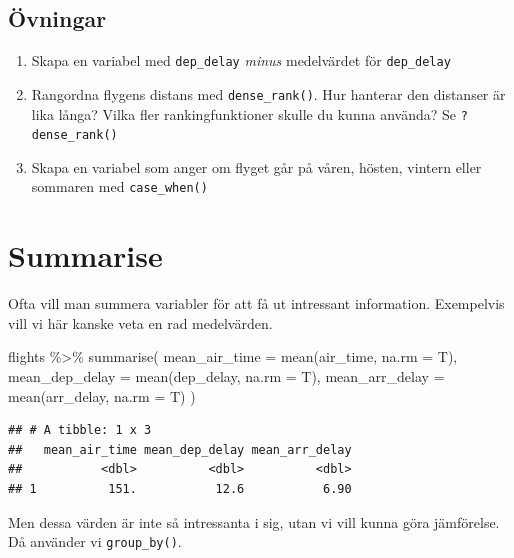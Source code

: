 \documentclass[
]{book}
\newenvironment{Shaded}{\begin{snugshade}}{\end{snugshade}}
\newcommand{\AttributeTok}[1]{\textcolor[rgb]{0.77,0.63,0.00}{#1}}
\newcommand{\FunctionTok}[1]{\textcolor[rgb]{0.00,0.00,0.00}{#1}}
\newcommand{\NormalTok}[1]{#1}
\newcommand{\SpecialCharTok}[1]{\textcolor[rgb]{0.00,0.00,0.00}{#1}}
\begin{document}
\hypertarget{uxf6vningar}{%
\subsection{Övningar}\label{uxf6vningar}}

\begin{enumerate}
\def\labelenumi{\arabic{enumi}.}
\item
  Skapa en variabel med \texttt{dep\_delay} \emph{minus} medelvärdet för \texttt{dep\_delay}
\item
  Rangordna flygens distans med \texttt{dense\_rank()}. Hur hanterar den distanser är lika långa? Vilka fler rankingfunktioner skulle du kunna använda? Se \texttt{?dense\_rank()}
\item
  Skapa en variabel som anger om flyget går på våren, hösten, vintern eller sommaren med \texttt{case\_when()}
\end{enumerate}

\hypertarget{summarise}{%
\section{Summarise}\label{summarise}}

Ofta vill man summera variabler för att få ut intressant information. Exempelvis vill vi här kanske veta en rad medelvärden.

\begin{Shaded}
\begin{Highlighting}[]
\NormalTok{flights }\SpecialCharTok{\%\textgreater{}\%} 
  \FunctionTok{summarise}\NormalTok{(}
    \AttributeTok{mean\_air\_time =} \FunctionTok{mean}\NormalTok{(air\_time, }\AttributeTok{na.rm =}\NormalTok{ T),}
    \AttributeTok{mean\_dep\_delay =} \FunctionTok{mean}\NormalTok{(dep\_delay, }\AttributeTok{na.rm =}\NormalTok{ T),}
    \AttributeTok{mean\_arr\_delay =} \FunctionTok{mean}\NormalTok{(arr\_delay, }\AttributeTok{na.rm =}\NormalTok{ T)}
\NormalTok{  )}
\end{Highlighting}
\end{Shaded}

\begin{verbatim}
## # A tibble: 1 x 3
##   mean_air_time mean_dep_delay mean_arr_delay
##           <dbl>          <dbl>          <dbl>
## 1          151.           12.6           6.90
\end{verbatim}

Men dessa värden är inte så intressanta i sig, utan vi vill kunna göra jämförelse. Då använder vi \texttt{group\_by()}.
\end{document}
